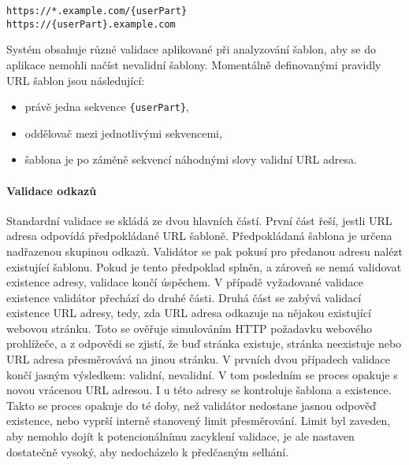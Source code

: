 			\begin{codeblock}
				\begin{verbatim}
https://*.example.com/{userPart}
https://{userPart}.example.com
				\end{verbatim}
			\end{codeblock}

			Systém obsahuje různé validace aplikované při analyzování šablon, aby se do aplikace nemohli načíst
			nevalidní šablony.
			Momentálně definovanými pravidly URL šablon jsou následující:
			\begin{itemize}
				\item právě jedna sekvence \lstinline!{userPart}!,
				\item oddělovač mezi jednotlivými sekvencemi,
				\item šablona je po záměně sekvencí náhodnými slovy validní \ac{URL} adresa.
			\end{itemize}

			\paragraph{Validace odkazů}

			Standardní validace se skládá ze dvou hlavních částí.
			První část řeší, jestli \ac{URL} adresa odpovídá předpokládané \ac{URL} šabloně.
			Předpokládaná šablona je určena nadřazenou skupinou odkazů.
			Validátor se pak pokusí pro předanou adresu nalézt existující šablonu.
			Pokud je tento předpoklad splněn, a zároveň se nemá validovat existence adresy, validace končí úspěchem.
			V případě vyžadované validace existence validátor přechází do druhé části.
			Druhá část se zabývá validací existence \ac{URL} adresy, tedy, zda URL adresa odkazuje na nějakou existující
			webovou stránku.
			Toto se ověřuje simulováním \ac{HTTP} požadavku webového prohlížeče, a z odpovědi se zjistí, že buď stránka
			existuje, stránka neexistuje nebo \ac{URL} adresa přesměrovává na jinou stránku.
			V prvních dvou případech validace končí jasným výsledkem: validní, nevalidní.
			V tom posledním se proces opakuje s novou vrácenou \ac{URL} adresou.
			I u této adresy se kontroluje šablona a existence.
			Takto se proces opakuje do té doby, než validátor nedostane jasnou odpověď existence, nebo vyprší interně stanovený
			limit přesměrování.
			Limit byl zaveden, aby nemohlo dojít k potencionálnímu zacyklení validace,
			je ale nastaven dostatečně vysoký, aby nedocházelo k předčasným selhání.

